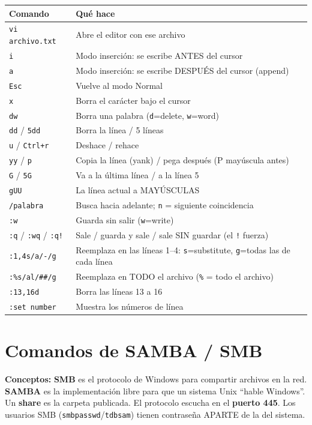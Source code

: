 \begin{center}
\begin{tabularx}{\textwidth}{lX}
  \toprule
  \textbf{Comando} & \textbf{Qué hace} \\
  \midrule
  \texttt{vi archivo.txt} & Abre el editor con ese archivo \\
  \texttt{i} & Modo inserción: se escribe ANTES del cursor \\
  \texttt{a} & Modo inserción: se escribe DESPUÉS del cursor (append) \\
  \texttt{Esc} & Vuelve al modo Normal \\
  \texttt{x} & Borra el carácter bajo el cursor \\
  \texttt{dw} & Borra una palabra (\texttt{d}=delete, \texttt{w}=word) \\
  \texttt{dd} / \texttt{5dd} & Borra la línea / 5 líneas \\
  \texttt{u} / \texttt{Ctrl+r} & Deshace / rehace \\
  \texttt{yy} / \texttt{p} & Copia la línea (yank) / pega después (P mayúscula antes) \\
  \texttt{G} / \texttt{5G} & Va a la última línea / a la línea 5 \\
  \texttt{gUU} & La línea actual a MAYÚSCULAS \\
  \texttt{/palabra} & Busca hacia adelante; \texttt{n} = siguiente coincidencia \\
  \texttt{:w} & Guarda sin salir (\texttt{w}=write) \\
  \texttt{:q} / \texttt{:wq} / \texttt{:q!} & Sale / guarda y sale / sale SIN guardar (el \texttt{!} fuerza) \\
  \texttt{:1,4s/a/-/g} & Reemplaza en las líneas 1--4: \texttt{s}=substitute, \texttt{g}=todas las de cada línea \\
  \texttt{:\%s/al/\#\#/g} & Reemplaza en TODO el archivo (\texttt{\%} = todo el archivo) \\
  \texttt{:13,16d} & Borra las líneas 13 a 16 \\
  \texttt{:set number} & Muestra los números de línea \\
  \bottomrule
\end{tabularx}
\end{center}

\section{Comandos de SAMBA / SMB}

\textbf{Conceptos:} \textbf{SMB} es el protocolo de Windows para compartir archivos en la red. \textbf{SAMBA} es la implementación libre para que un sistema Unix ``hable Windows''. Un \textbf{share} es la carpeta publicada. El protocolo escucha en el \textbf{puerto 445}. Los usuarios SMB (\texttt{smbpasswd}/\texttt{tdbsam}) tienen contraseña APARTE de la del sistema.

